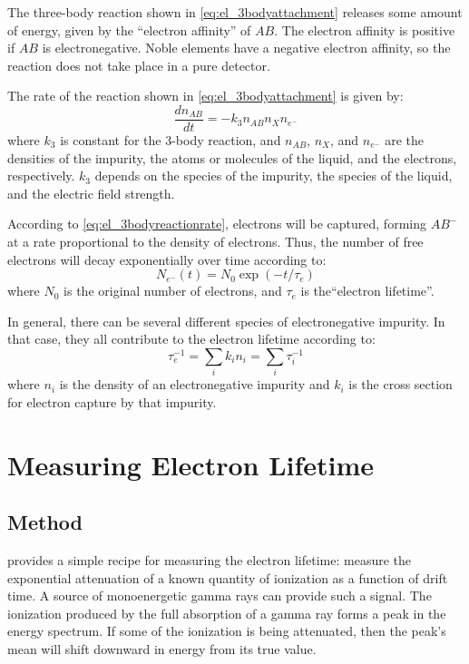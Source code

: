 \documentclass[herrin-thesis.tex]{subfiles}
\begin{document}
The three-body reaction shown in \cref{eq:el_3bodyattachment} releases some amount of energy, given by the ``electron affinity'' of \(AB\). The electron affinity is positive if \(AB\) is electronegative. Noble elements have a negative electron affinity, so the reaction does not take place in a pure detector.

The rate of the reaction shown in \cref{eq:el_3bodyattachment} is given by:
\begin{equation}
\frac{dn_{AB}}{dt} = -k_{3} n_{AB} n_{X} n_{e^{-}}
\label{eq:el_3bodyreactionrate}
\end{equation}
where \(k_3\) is constant for the 3-body reaction, and \(n_{AB}\), \(n_{X}\), and \(n_{e^{-}}\) are the densities of the impurity, the atoms or molecules of the liquid, and the electrons, respectively. \(k_3\) depends on the species of the impurity, the species of the liquid, and the electric field strength.

According to \cref{eq:el_3bodyreactionrate}, electrons will be captured, forming \(AB^{-}\) at a rate proportional to the density of electrons. Thus, the number of free electrons will decay exponentially over time according to:
\begin{equation}
N_{e^{-}}(t) = N_0 \exp (-t/\tau_e)
\label{eq:el_exponentialtaue}
\end{equation}
where \(N_0\) is the original number of electrons, and \(\tau_e\) is the``electron lifetime''.

In general, there can be several different species of electronegative impurity. In that case, they all contribute to the electron lifetime according to:
\begin{equation}
\tau_e^{-1} = \sum_i k_i n_i = \sum_i\tau_i^{-1}
\label{eq:el_tauedefinition}
\end{equation}
where \(n_i\) is the density of an electronegative impurity and \(k_i\) is the cross section for electron capture by that impurity.

\section{Measuring Electron Lifetime}

\subsection{Method}
 provides a simple recipe for measuring the electron lifetime: measure the exponential attenuation of a known quantity of ionization as a function of drift time. A source of monoenergetic gamma rays can provide such a signal. The ionization produced by the full absorption of a gamma ray forms a peak in the energy spectrum. If some of the ionization is being attenuated, then the peak's mean will shift downward in energy from its true value.
\end{document}
